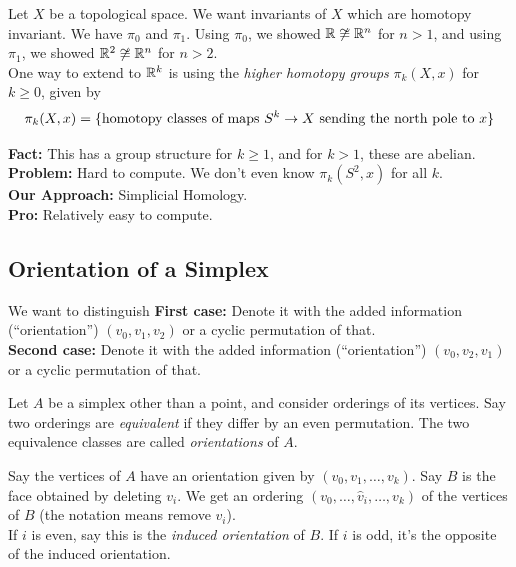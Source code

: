 
Let $X$ be a topological space. We want invariants of $X$ which are homotopy invariant. We have $\pi_0$ and $\pi_1$. Using $\pi_0$, we showed $\R \not\cong \R^n$ for $n > 1$, and using $\pi_1$, we showed $\R^2 \not\cong \R^n$ for $n > 2$.\\

One way to extend to $\R^k$ is using the \emph{higher homotopy groups} $\pi_k(X, x)$ for $k \geq 0$, given by
\[ \pi_k(X, x) = \{\tt{homotopy classes of maps } S^k \to X \tt{ sending the north pole to } x\} \]

\textbf{Fact:} This has a group structure for $k \geq 1$, and for $k > 1$, these are abelian.\\

\textbf{Problem:} Hard to compute. We don't even know $\pi_k(S^2, x)$ for all $k$.\\

\textbf{Our Approach:} Simplicial Homology.\\

\textbf{Pro:} Relatively easy to compute.

\subsection*{Orientation of a Simplex}
\sectionspace

We want to distinguish
\textbf{First case:} Denote it with the added information (``orientation'') $(v_0, v_1, v_2)$ or a cyclic permutation of that.\\

\textbf{Second case:} Denote it with the added information (``orientation'') $(v_0, v_2, v_1)$ or a cyclic permutation of that.

\begin{definition}
    Let $A$ be a simplex other than a point, and consider orderings of its vertices. Say two orderings are \emph{equivalent} if they differ by an even permutation. The two equivalence classes are called \emph{orientations} of $A$.
\end{definition}

\begin{definition}
    Say the vertices of $A$ have an orientation given by $(v_0, v_1, \ldots, v_k)$. Say $B$ is the face obtained by deleting $v_i$. We get an ordering $(v_0, \ldots, \widehat{v}_i, \ldots, v_k)$ of the vertices of $B$ (the notation means remove $v_i$).\\

    If $i$ is even, say this is the \emph{induced orientation} of $B$. If $i$ is odd, it's the opposite of the induced orientation.
\end{definition}


